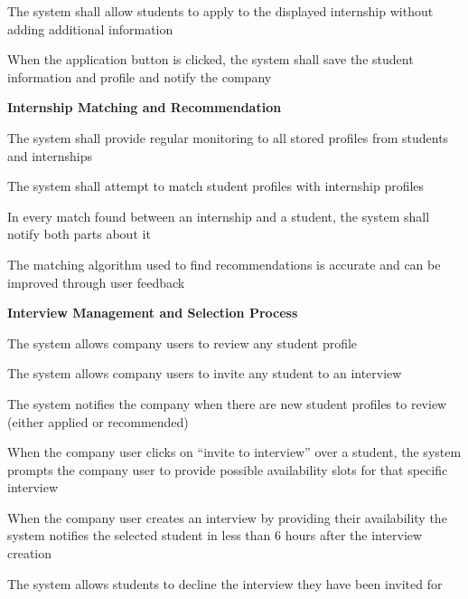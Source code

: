 \begin{enumerate}[label={[R\arabic*]}]
\item The system shall allow students to apply to the displayed internship without adding additional information


\item When the application button is clicked, the system shall save the student information and profile and notify the company

\item[] \textbf{Internship Matching and Recommendation}


\item The system shall provide regular monitoring to all stored profiles from students and internships


\item The system shall attempt to match student profiles with internship profiles


\item In every match found between an internship and a student, the system shall notify both parts about it


\item The matching algorithm used to find recommendations is accurate and can be improved through user feedback

\item[] \textbf{Interview Management and Selection Process}


\item The system allows company users to review any student profile


\item The system allows company users to invite any student to an interview


\item The system notifies the company when there are new student profiles to review (either applied or recommended)


\item When the company user clicks on “invite to interview” over a student, the system prompts the company user to provide possible availability slots for that specific interview

 
\item When the company user creates an interview by providing their availability the system notifies the selected student in less than 6 hours after the interview creation


\item The system allows students to decline the interview they have been invited for


\end{enumerate}
